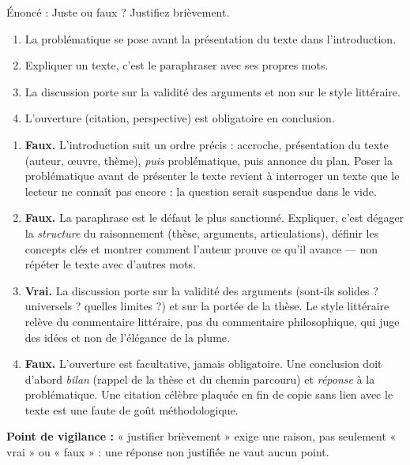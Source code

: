 \documentclass[11pt]{article}
\newcommand{\cle}[1]{{\popxbold\color{popdark}#1}}
\begin{document}
\begin{exoresolu}
Énoncé : Juste ou faux ? Justifiez brièvement.
\begin{enumerate}
\item La problématique se pose avant la présentation du texte dans l'introduction.
\item Expliquer un texte, c'est le paraphraser avec ses propres mots.
\item La discussion porte sur la validité des arguments et non sur le style littéraire.
\item L'ouverture (citation, perspective) est obligatoire en conclusion.
\end{enumerate}
\tcblower
\begin{enumerate}
\item \textbf{Faux.} L'introduction suit un ordre précis : accroche, présentation du texte (auteur, \oe uvre, thème), \emph{puis} problématique, puis annonce du plan. Poser la problématique avant de présenter le texte revient à interroger un texte que le lecteur ne connaît pas encore : la question serait suspendue dans le vide.
\item \textbf{Faux.} La paraphrase est le défaut le plus sanctionné. Expliquer, c'est dégager la \emph{structure} du raisonnement (thèse, arguments, articulations), définir les concepts clés et montrer comment l'auteur prouve ce qu'il avance — non répéter le texte avec d'autres mots.
\item \textbf{Vrai.} La discussion porte sur la \cle{validité} des arguments (sont-ils solides ? universels ? quelles limites ?) et sur la portée de la thèse. Le style littéraire relève du commentaire littéraire, pas du commentaire philosophique, qui juge des idées et non de l'élégance de la plume.
\item \textbf{Faux.} L'ouverture est facultative, jamais obligatoire. Une conclusion doit d'abord \emph{bilan} (rappel de la thèse et du chemin parcouru) et \emph{réponse} à la problématique. Une citation célèbre plaquée en fin de copie sans lien avec le texte est une faute de goût méthodologique.
\end{enumerate}

\textbf{Point de vigilance :} « justifier brièvement » exige une raison, pas seulement « vrai » ou « faux » : une réponse non justifiée ne vaut aucun point.
\end{exoresolu}
\end{document}
